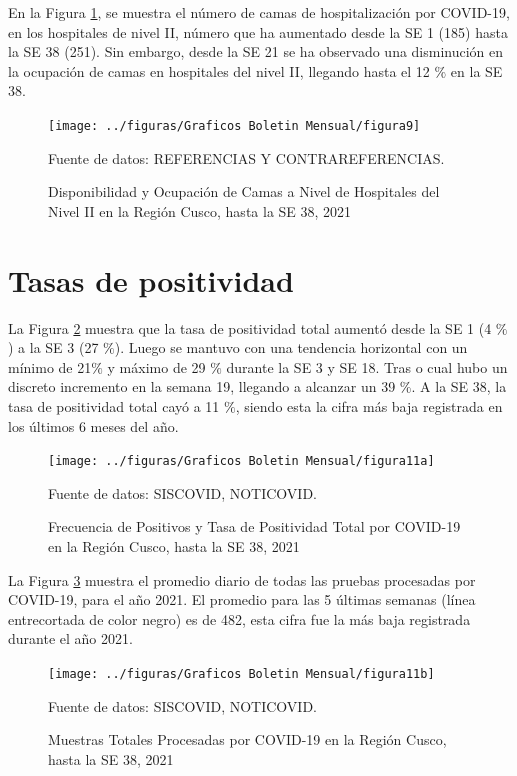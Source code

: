 \documentclass[12pt,a4paper,openany]{book}
\begin{document}
	En la Figura \ref{fig:ocupacion_2nivel}, se muestra el número de camas de hospitalización por COVID-19, en los hospitales de nivel II, número que ha aumentado desde la SE 1 (185) hasta la SE 38 (251). Sin embargo, desde la SE 21 se ha observado una disminución en la ocupación de camas en hospitales del nivel II, llegando hasta el 12 $\%$ en la SE 38.
	
	\begin{figure}[h]
	\caption{Disponibilidad y Ocupación de Camas a Nivel de Hospitales del Nivel II en la Región Cusco, hasta la SE 38, 2021}\label{fig:ocupacion_2nivel}
	\begin{center}
		\texttt{[image: ../figuras/Graficos Boletin Mensual/figura9]}
	\end{center}
	{\footnotesize {Fuente de datos: REFERENCIAS Y CONTRAREFERENCIAS.}}
	\end{figure}

\clearpage

	\section*{Tasas de positividad}
	\noindent  La Figura \ref{fig:tasa_positividad} muestra que la tasa de positividad total aumentó desde la SE 1 (4 $\%$) a la SE 3 (27 $\%$). Luego se mantuvo con una tendencia horizontal con un mínimo de 21$\%$ y máximo de 29 $\%$ durante la SE 3 y SE 18. Tras o cual hubo un discreto incremento en la semana 19, llegando a alcanzar un 39 $\%$. A la SE 38, la tasa de positividad total cayó a 11 $\%$, siendo esta la cifra más baja registrada en los últimos 6 meses del año.

	\begin{figure}[h]
	\caption{Frecuencia de Positivos y Tasa de Positividad Total por COVID-19 en la Región Cusco, hasta la SE 38, 2021  }\label{fig:tasa_positividad}
	\begin{center}
		\texttt{[image: ../figuras/Graficos Boletin Mensual/figura11a]}
	\end{center}
	{\footnotesize {Fuente de datos: SISCOVID, NOTICOVID.}}
	\end{figure}

	La Figura \ref{fig:total_muestras_procesada} muestra el promedio diario de todas las pruebas procesadas por COVID-19, para el año 2021. El promedio para las 5 últimas semanas (línea entrecortada de color negro) es de 482, esta cifra fue la más baja registrada durante el año 2021.
 
	\begin{figure}[h]
	\caption{Muestras Totales Procesadas por COVID-19 en la Región Cusco, hasta la SE 38, 2021}\label{fig:total_muestras_procesada}
	\begin{center}
		\texttt{[image: ../figuras/Graficos Boletin Mensual/figura11b]}
	\end{center}
	{\footnotesize {Fuente de datos: SISCOVID, NOTICOVID.}}
	\end{figure}
\end{document}
